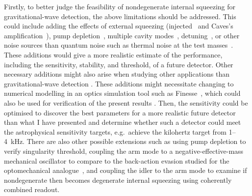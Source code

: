 Firstly, to better judge the feasibility of nondegenerate internal squeezing for gravitational-wave detection, the above limitations should be addressed. This could include adding the effects of external squeezing (injected~\cite{} and Caves's amplification~\cite{}), pump depletion~\cite{}, multiple cavity modes~\cite{liEnhancingInterferometerSensitivity2021,}, detuning~\cite{}, or other noise sources than quantum noise such as thermal noise at the test masses~\cite{}. These additions would give a more realistic estimate of the performance, including the sensitivity, stability, and threshold, of a future detector. Other necessary additions might also arise when studying other applications than gravitational-wave detection . These additions might necessitate changing to numerical modelling in an optics simulation tool such as Finesse~\cite{}, which could also be used for verification of the present results . Then, the sensitivity could be optimised to discover the best parameters for a more realistic future detector than what I have presented and determine whether such a detector could meet the astrophysical sensitivity targets, e.g.\ achieve the kilohertz target from 1--4~kHz.
There are also other possible extensions such as using pump depletion to verify singularity threshold, coupling the arm mode to a negative-effective-mass mechanical oscillator to compare to the back-action evasion studied for the optomechanical analogue~\cite{}, and coupling the idler to the arm mode to examine if nondegenerate then becomes degenerate internal squeezing using coherently combined readout.

